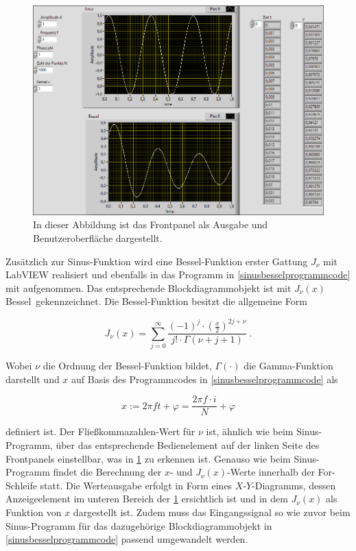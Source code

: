\documentclass[
a4paper,
12pt,
pagesize,
ngerman
]{scrartcl}
\begin{document}
	\begin{figure}[H]
		\centering
		\includegraphics[width=1.0\textwidth]{EIRE2018Dateien/Tag1/sinusbessel-bilder/SinusBesselp}
		\caption{In dieser Abbildung ist das Frontpanel als Ausgabe und Benutzeroberfläche dargestellt.}
		\label{sinusbesselausgabe}
	\end{figure}

	\noindent Zusätzlich zur Sinus-Funktion wird eine Bessel-Funktion erster Gattung $J_{\nu}$ mit LabVIEW realisiert und ebenfalls in das Programm in \cref{sinusbesselprogrammcode} mit aufgenommen. Das entsprechende Blockdiagrammobjekt ist mit \glqq $J_{\nu}(x)$ Bessel\grqq\ gekennzeichnet. Die Bessel-Funktion besitzt die allgemeine Form
	
	\begin{equation}
	J_{\nu}(x) = \sum_{j=0}^{\infty}\frac{(-1)^j \cdot \left( \frac{x}{2}\right) ^{2j+\nu}}{j! \cdot \Gamma(\nu + j + 1)} \ . %
	\end{equation}
	
	\noindent Wobei $\nu$ die Ordnung der Bessel-Funktion bildet, $\Gamma(\cdot)$ die Gamma-Funktion darstellt und $x$ auf Basis des Programmcodes in \cref{sinusbesselprogrammcode} als %
	
	\begin{equation}
	x := 2\pi f t + \varphi = \frac{2\pi f \cdot i}{N} + \varphi
	\end{equation}
	
	\noindent definiert ist. Der Fließkommazahlen-Wert für $\nu$ ist, ähnlich wie beim Sinus-Programm, über das entsprechende Bedienelement auf der linken Seite des Frontpanels einstellbar, was in \cref{sinusbesselausgabe} zu erkennen ist. Genauso wie beim Sinus-Programm findet die Berechnung der $x$- und $J_{\nu}(x)$-Werte innerhalb der For-Schleife statt. Die Werteausgabe erfolgt in Form eines $X$-$Y$-Diagramms, dessen Anzeigeelement im unteren Bereich der \cref{sinusbesselausgabe} ersichtlich ist und in dem $J_{\nu}(x)$ als Funktion von $x$ dargestellt ist. Zudem muss das Eingangssignal so wie zuvor beim Sinus-Programm für das dazugehörige Blockdiagrammobjekt in \cref{sinusbesselprogrammcode} passend umgewandelt werden.
\end{document}
